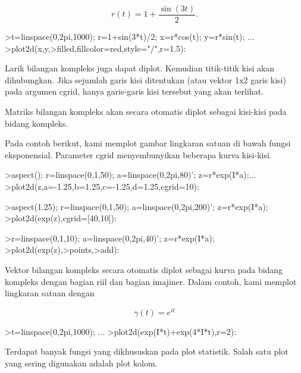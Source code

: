 \documentclass[a4paper,10pt]{article}
\begin{document}
\begin{eulernotebook}
\begin{eulercomment}
\begin{eulercomment}
\begin{eulercomment}
\end{eulercomment}
\begin{eulerformula}
\[
r(t) = 1 + \dfrac{\sin(3t)}{2}.
\]
\end{eulerformula}
\begin{eulerprompt}
>t=linspace(0,2pi,1000); r=1+sin(3*t)/2; x=r*cos(t); y=r*sin(t); ...
>plot2d(x,y,>filled,fillcolor=red,style="/",r=1.5):
\end{eulerprompt}
\begin{eulercomment}
Larik bilangan kompleks juga dapat diplot. Kemudian titik-titik kisi
akan dihubungkan. Jika sejumlah garis kisi ditentukan (atau vektor 1x2
garis kisi) pada argumen cgrid, hanya garis-garis kisi tersebut yang
akan terlihat.

Matriks bilangan kompleks akan secara otomatis diplot sebagai
kisi-kisi pada bidang kompleks.

Pada contoh berikut, kami memplot gambar lingkaran satuan di bawah
fungsi eksponensial. Parameter cgrid menyembunyikan beberapa kurva
kisi-kisi.
\end{eulercomment}
\begin{eulerprompt}
>aspect(); r=linspace(0,1,50); a=linspace(0,2pi,80)'; z=r*exp(I*a);...
>plot2d(z,a=-1.25,b=1.25,c=-1.25,d=1.25,cgrid=10):
\end{eulerprompt}
\begin{eulerprompt}
>aspect(1.25); r=linspace(0,1,50); a=linspace(0,2pi,200)'; z=r*exp(I*a);
>plot2d(exp(z),cgrid=[40,10]):
\end{eulerprompt}
\begin{eulerprompt}
>r=linspace(0,1,10); a=linspace(0,2pi,40)'; z=r*exp(I*a);
>plot2d(exp(z),>points,>add):
\end{eulerprompt}
\begin{eulercomment}
Vektor bilangan kompleks secara otomatis diplot sebagai kurva pada
bidang kompleks dengan bagian riil dan bagian imajiner. Dalam contoh,
kami memplot lingkaran satuan dengan

\end{eulercomment}
\begin{eulerformula}
\[
\gamma(t) = e^{it}
\]
\end{eulerformula}
\begin{eulerprompt}
>t=linspace(0,2pi,1000); ...
>plot2d(exp(I*t)+exp(4*I*t),r=2):
\end{eulerprompt}
\begin{eulercomment}
Terdapat banyak fungsi yang dikhususkan pada plot statistik. Salah
satu plot yang sering digunakan adalah plot kolom. 


\end{eulercomment}
\end{eulercomment}
\end{eulercomment}
\end{eulernotebook}
\end{document}
